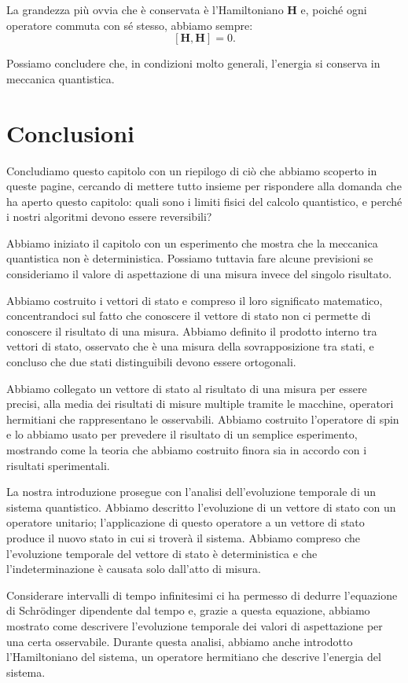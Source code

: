 La grandezza più ovvia che è conservata è l'Hamiltoniano $\mathbf{H}$ e, poiché ogni operatore commuta con sé stesso, abbiamo sempre:
\[
[\mathbf{H},\mathbf{H}] = 0.
\]

Possiamo concludere che, in condizioni molto generali, l'energia si conserva in meccanica quantistica.

\section{Conclusioni}
Concludiamo questo capitolo con un riepilogo di ciò che abbiamo scoperto in queste pagine, cercando di mettere tutto insieme per rispondere alla domanda che ha aperto questo capitolo: quali sono i limiti fisici del calcolo quantistico, e perché i nostri algoritmi devono essere reversibili?

Abbiamo iniziato il capitolo con un esperimento che mostra che la meccanica quantistica non è deterministica. Possiamo tuttavia fare alcune previsioni se consideriamo il valore di aspettazione di una misura invece del singolo risultato.

Abbiamo costruito i vettori di stato e compreso il loro significato matematico, concentrandoci sul fatto che conoscere il vettore di stato non ci permette di conoscere il risultato di una misura. Abbiamo definito il prodotto interno tra vettori di stato, osservato che è una misura della sovrapposizione tra stati, e concluso che due stati distinguibili devono essere ortogonali.

Abbiamo collegato un vettore di stato al risultato di una misura \textendash{}per essere precisi, alla media dei risultati di misure multiple\textendash{} tramite le macchine, operatori hermitiani che rappresentano le osservabili. Abbiamo costruito l'operatore di spin e lo abbiamo usato per prevedere il risultato di un semplice esperimento, mostrando come la teoria che abbiamo costruito finora sia in accordo con i risultati sperimentali.

La nostra introduzione prosegue con l'analisi dell'evoluzione temporale di un sistema quantistico. Abbiamo descritto l'evoluzione di un vettore di stato con un operatore unitario; l'applicazione di questo operatore a un vettore di stato produce il nuovo stato in cui si troverà il sistema. Abbiamo compreso che l'evoluzione temporale del vettore di stato è deterministica e che l'indeterminazione è causata solo dall'atto di misura.

Considerare intervalli di tempo infinitesimi ci ha permesso di dedurre l'equazione di Schrödinger dipendente dal tempo e, grazie a questa equazione, abbiamo mostrato come descrivere l'evoluzione temporale dei valori di aspettazione per una certa osservabile. Durante questa analisi, abbiamo anche introdotto l'Hamiltoniano del sistema, un operatore hermitiano che descrive l'energia del sistema. 

